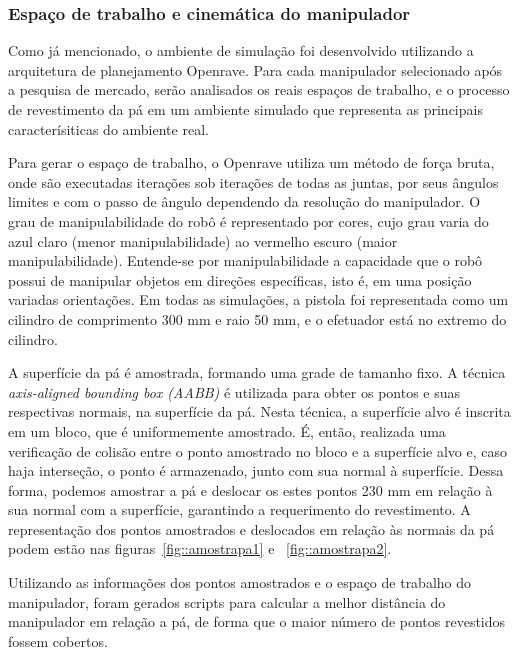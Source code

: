 \subsubsection{Espaço de trabalho e cinemática do manipulador}
Como já mencionado, o ambiente de simulação foi desenvolvido utilizando a
arquitetura de planejamento Openrave. Para cada manipulador selecionado após a
pesquisa de mercado, serão analisados os reais espaços de trabalho, e o processo de
revestimento da pá em um ambiente simulado que representa as principais
caracterísiticas do ambiente real.

Para gerar o espaço de trabalho, o Openrave utiliza um método de força bruta,
onde são executadas iterações sob iterações de todas as juntas, por seus ângulos
limites e com o passo de ângulo dependendo da resolução do manipulador. O grau
de manipulabilidade do robô é representado por cores, cujo grau varia do azul
claro (menor manipulabilidade) ao vermelho escuro (maior manipulabilidade).
Entende-se por manipulabilidade a capacidade que o robô possui de manipular
objetos em direções específicas, isto é, em uma posição variadas orientações. Em
todas as simulações, a pistola foi representada como um cilindro de comprimento
300 mm e raio 50 mm, e o efetuador está no extremo do cilindro.

A superfície da pá é amostrada, formando uma grade de tamanho fixo. A técnica
\textit{axis-aligned bounding box (AABB)} é utilizada para obter os
pontos e suas respectivas normais, na superfície da pá. Nesta técnica, a
superfície alvo é inscrita em um bloco, que é uniformemente amostrado. É, então,
realizada uma verificação de colisão entre o ponto amostrado no bloco e a
superfície alvo e, caso haja interseção, o ponto é armazenado, junto com sua
normal à superfície. Dessa forma, podemos amostrar a pá e deslocar os
estes pontos 230 mm em relação à sua normal com a superfície, garantindo a
requerimento do revestimento. A representação dos pontos amostrados e deslocados
em relação às normais da pá podem estão nas figuras~\ref{fig::amostrapa1} e
~\ref{fig::amostrapa2}.

Utilizando as informações dos pontos amostrados e o espaço de trabalho do
manipulador, foram gerados scripts para calcular a
melhor distância do manipulador em relação a pá, de forma que o maior número de
pontos revestidos fossem cobertos.

